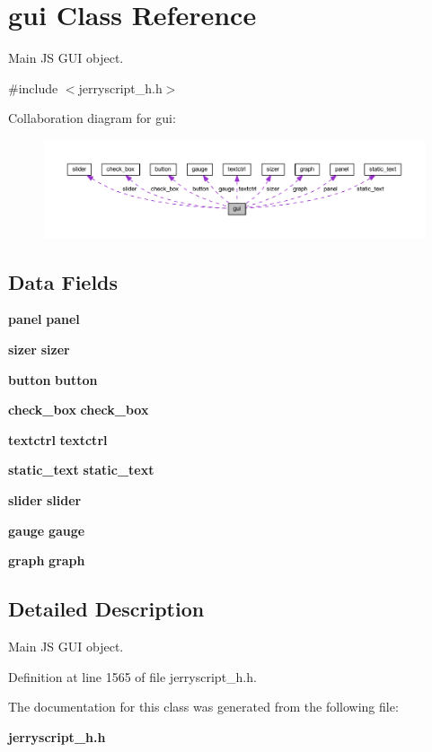 \section{gui Class Reference}
\label{classgui}


Main JS G\+UI object.  




{\ttfamily \#include $<$jerryscript\+\_\+h.\+h$>$}



Collaboration diagram for gui\+:\nopagebreak
\begin{figure}[H]
\begin{center}
\leavevmode
\includegraphics[width=350pt]{classgui__coll__graph}
\end{center}
\end{figure}
\subsection*{Data Fields}
\begin{DoxyCompactItemize}
\item 
\mbox{\label{classgui_a5865d95b775346aee2512dec1b27701f}} 
\textbf{ panel} {\bfseries panel}
\item 
\mbox{\label{classgui_aa6a729e4fc40c42b5a0b572302e714df}} 
\textbf{ sizer} {\bfseries sizer}
\item 
\mbox{\label{classgui_a9d9f18ad7021aaf102ccc991439eb6fb}} 
\textbf{ button} {\bfseries button}
\item 
\mbox{\label{classgui_ad51c81be1a96dbb9e6393615d1dc77b4}} 
\textbf{ check\+\_\+box} {\bfseries check\+\_\+box}
\item 
\mbox{\label{classgui_af2fb20dbecb7ec6c3125f354d56bbb5f}} 
\textbf{ textctrl} {\bfseries textctrl}
\item 
\mbox{\label{classgui_a4b00419b90d4fab69c342922abe0ac18}} 
\textbf{ static\+\_\+text} {\bfseries static\+\_\+text}
\item 
\mbox{\label{classgui_a0b517e9ac438dbad32a8405260f3e739}} 
\textbf{ slider} {\bfseries slider}
\item 
\mbox{\label{classgui_a1e350661061c75e580e13d87b9710f4f}} 
\textbf{ gauge} {\bfseries gauge}
\item 
\mbox{\label{classgui_a7d931efceb60400ac611d573ac0a9e99}} 
\textbf{ graph} {\bfseries graph}
\end{DoxyCompactItemize}


\subsection{Detailed Description}
Main JS G\+UI object. 

Definition at line 1565 of file jerryscript\+\_\+h.\+h.



The documentation for this class was generated from the following file\+:\begin{DoxyCompactItemize}
\item 
\textbf{ jerryscript\+\_\+h.\+h}\end{DoxyCompactItemize}
